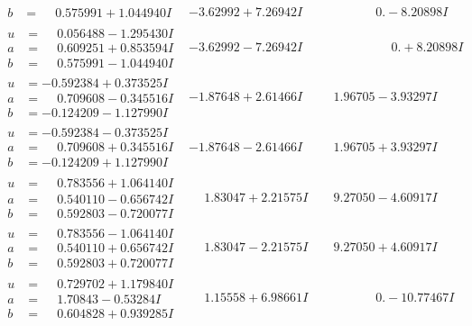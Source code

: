 \documentclass[1p]{elsarticle_modified}
\theoremstyle{definition}
\begin{document}
$$\begin{array}{c|c|c}
\begin{aligned}
b &= \phantom{-}0.575991 + 1.044940 I\end{aligned}
 & -3.62992 + 7.26942 I & \phantom{-0.000000 } 0. - 8.20898 I \\ \hline\begin{aligned}
u &= \phantom{-}0.056488 - 1.295430 I \\
a &= \phantom{-}0.609251 + 0.853594 I \\
b &= \phantom{-}0.575991 - 1.044940 I\end{aligned}
 & -3.62992 - 7.26942 I & \phantom{-0.000000 -}0. + 8.20898 I \\ \hline\begin{aligned}
u &= -0.592384 + 0.373525 I \\
a &= \phantom{-}0.709608 - 0.345516 I \\
b &= -0.124209 - 1.127990 I\end{aligned}
 & -1.87648 + 2.61466 I & \phantom{-}1.96705 - 3.93297 I \\ \hline\begin{aligned}
u &= -0.592384 - 0.373525 I \\
a &= \phantom{-}0.709608 + 0.345516 I \\
b &= -0.124209 + 1.127990 I\end{aligned}
 & -1.87648 - 2.61466 I & \phantom{-}1.96705 + 3.93297 I \\ \hline\begin{aligned}
u &= \phantom{-}0.783556 + 1.064140 I \\
a &= \phantom{-}0.540110 - 0.656742 I \\
b &= \phantom{-}0.592803 - 0.720077 I\end{aligned}
 & \phantom{-}1.83047 + 2.21575 I & \phantom{-}9.27050 - 4.60917 I \\ \hline\begin{aligned}
u &= \phantom{-}0.783556 - 1.064140 I \\
a &= \phantom{-}0.540110 + 0.656742 I \\
b &= \phantom{-}0.592803 + 0.720077 I\end{aligned}
 & \phantom{-}1.83047 - 2.21575 I & \phantom{-}9.27050 + 4.60917 I \\ \hline\begin{aligned}
u &= \phantom{-}0.729702 + 1.179840 I \\
a &= \phantom{-}1.70843 - 0.53284 I \\
b &= \phantom{-}0.604828 + 0.939285 I\end{aligned}
 & \phantom{-}1.15558 + 6.98661 I & \phantom{-0.000000 } 0. - 10.77467 I \\ \hline\begin{aligned}

\end{aligned}
\end{array}$$
\end{document}
